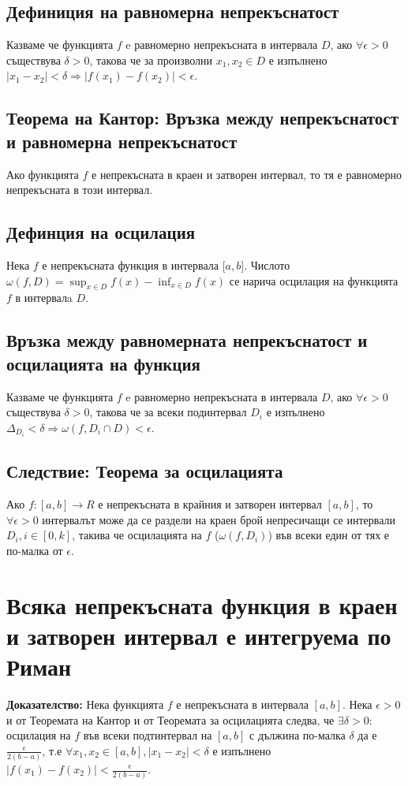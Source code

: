 \documentclass[fleqn,12pt]{article}
\begin{document}
\subsection{Дефиниция на равномерна непрекъснатост}
Казваме че функцията $f$ e равномерно непрекъсната в интервала $D$, ако $\forall \epsilon>0$ съществува $\delta>0$,
такова че за произволни $x_1,x_2 \in D$ е изпълнено $|x_1 - x_2|<\delta \Rightarrow |f(x_1)-f(x_2)|<\epsilon$.

\subsection{Теорема на Кантор: Връзка между непрекъснатост и равномерна непрекъснатост}
Ако функцията $f$ е непрекъсната в краен и затворен интервал, то тя е равномерно непрекъсната в този интервал.

\subsection{Дефинция на осцилация}
Нека $f$ е непрекъсната функция в интервала $[a,b$]. Числото $\omega(f,D) = \sup_{x \in D} f(x) - \inf_{x \in D} f(x)$ се нарича осцилация на функцията $f$ в интервалa $D$.

\subsection{Връзка между равномерната непрекъснатост и осцилацията на функция}
Казваме че функцията $f$ e равномерно непрекъсната в интервала $D$, ако $\forall \epsilon>0$ съществува $\delta>0$, такова че 
за всеки подинтервал $D_i$ е изпълнено $\Delta_{D_i} < \delta \Rightarrow \omega(f,D_i \cap D) < \epsilon$.

\subsection{Следствие: Теорема за осцилацията}
Ако $f:[a,b] \rightarrow R$ е непрекъсната в крайния и затворен интервал $[a,b]$, то $\forall \epsilon>0$ интервалът може да се раздели на краен брой непресичащи се интервали $D_i, i\in[0,k]$,
такива че осцилацията на $f$ ($\omega(f,D_i)$) във всеки един от тях е по-малка от $\epsilon$. 


\section{Всяка непрекъсната функция в краен и затворен интервал е интегруема по Риман}
\textbf{Доказателство: } Нека функцията $f$ е непрекъсната в интервала $[a,b]$. Нека $\epsilon > 0$ и от Теоремата на Кантор и от Теоремата за осцилацията следва, че $\exists \delta>0 :$ осцилация на  $f$ във всеки подтинтервал
на $[a,b]$ с дължина по-малка $\delta$ да е $\frac{\epsilon}{2(b-a)}$, т.е $\forall x_1,x_2 \in [a,b] , |x_1 - x_2| < \delta$ е изпълнено $|f(x_1)-f(x_2)| < \frac{\epsilon}{2(b-a)}$.
\end{document}
